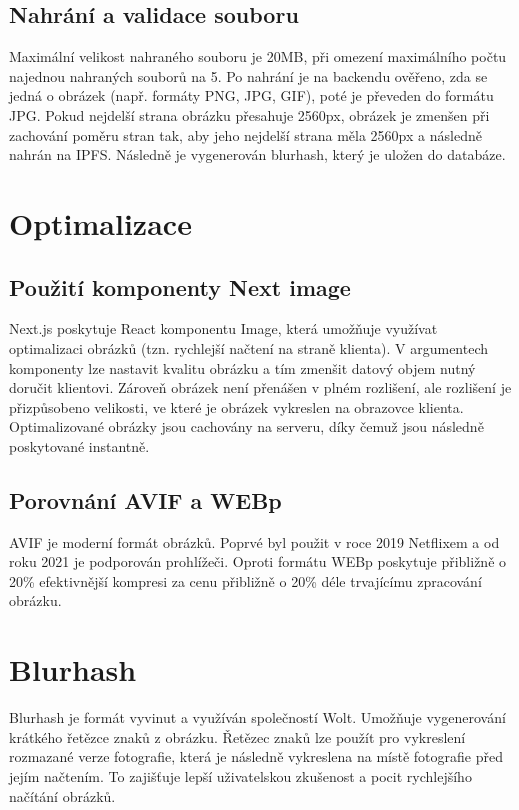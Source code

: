\documentclass[12pt, a4paper,
 twoside,        %
 openright
]{report}
\begin{document}
\subsection{Nahrání a validace souboru} Maximální velikost nahraného souboru je 20MB, při omezení maximálního počtu najednou nahraných souborů na 5.  Po nahrání je na backendu ověřeno, zda se jedná o obrázek (např. formáty PNG, JPG, GIF), poté je převeden do formátu JPG. Pokud nejdelší strana obrázku přesahuje 2560px, obrázek je zmenšen při zachování poměru stran tak, aby jeho nejdelší strana měla 2560px a následně nahrán na IPFS. Následně je vygenerován blurhash, který je uložen do databáze.
\section{Optimalizace}
\subsection{Použití komponenty Next image}   \label{subsubsection:nextImageComponent}
Next.js poskytuje React komponentu Image, která umožňuje využívat optimalizaci obrázků (tzn. rychlejší načtení na straně klienta). V argumentech komponenty lze nastavit kvalitu obrázku a tím zmenšit datový objem nutný doručit klientovi. Zároveň obrázek není přenášen v plném rozlišení, ale rozlišení je přizpůsobeno velikosti, ve které je obrázek vykreslen na obrazovce klienta. Optimalizované obrázky jsou cachovány na serveru, díky čemuž jsou následně poskytované instantně. \cite{nextImage}
\subsection{Porovnání AVIF a WEBp}
AVIF je moderní formát obrázků. Poprvé byl použit v roce 2019 Netflixem a od roku 2021 je podporován prohlížeči. Oproti formátu WEBp poskytuje přibližně o 20\% efektivnější kompresi za cenu přibližně o 20\% déle trvajícímu zpracování obrázku.

\section{Blurhash}\label{subsection:blurhash}
Blurhash je formát vyvinut a využíván společností Wolt. Umožňuje vygenerování krátkého řetězce znaků z obrázku. Řetězec znaků lze použít pro vykreslení rozmazané verze fotografie, která je následně vykreslena na místě fotografie před jejím načtením. To zajišťuje lepší uživatelskou zkušenost a pocit rychlejšího načítání obrázků. \cite{blurhash}\cite{blurhashWoltBlog}
\end{document}
